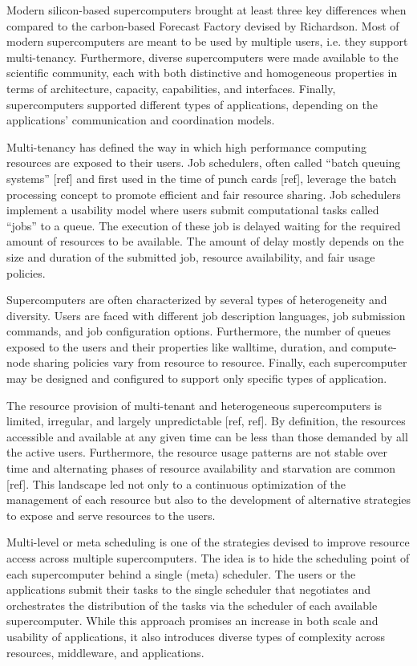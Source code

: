 \documentclass{sig-alternate}
\begin{document}
Modern silicon-based supercomputers brought at least three key differences when
compared to the carbon-based Forecast Factory devised by Richardson. Most of
modern supercomputers are meant to be used by multiple users, i.e. they support
multi-tenancy. Furthermore, diverse supercomputers were made available to the
scientific community, each with both distinctive and homogeneous properties in
terms of architecture, capacity, capabilities, and interfaces. Finally,
supercomputers supported different types of applications, depending on the
applications' communication and coordination models.

Multi-tenancy has defined the way in which high performance computing resources
are exposed to their users. Job schedulers, often called ``batch queuing
systems'' [ref] and first used in the time of punch cards [ref], leverage the
batch processing concept to promote efficient and fair resource sharing. Job
schedulers implement a usability model where users submit computational tasks
called ``jobs'' to a queue. The execution of these job is delayed waiting for
the required amount of resources to be available. The amount of delay mostly
depends on the size and duration of the submitted job, resource availability,
and fair usage policies.

Supercomputers are often characterized by several types of heterogeneity and
diversity. Users are faced with different job description languages, job
submission commands, and job configuration options. Furthermore,  the number of
queues exposed to the users and their properties like walltime, duration, and
compute-node sharing policies vary from resource to resource. Finally, each
supercomputer may be designed and configured to support only specific types of
application.

The resource provision of multi-tenant and heterogeneous supercomputers is
limited, irregular, and largely unpredictable [ref, ref]. By definition, the
resources accessible and available at any given time can be less than those
demanded by all the active users. Furthermore, the resource usage patterns are
not stable over time and alternating phases of resource availability and
starvation are common [ref]. This landscape led not only to a continuous
optimization of the management of each resource but also to the development of
alternative strategies to expose and serve resources to the users.

Multi-level or meta scheduling is one of the strategies devised to improve
resource access across multiple supercomputers. The idea is to hide the
scheduling point of each supercomputer behind a single (meta) scheduler. The
users or the applications submit their tasks to the single scheduler that
negotiates and orchestrates the distribution of the tasks via the scheduler of
each available supercomputer. While this approach promises an increase in both
scale and usability of applications, it also introduces diverse types of
complexity across resources, middleware, and applications.
\end{document}
